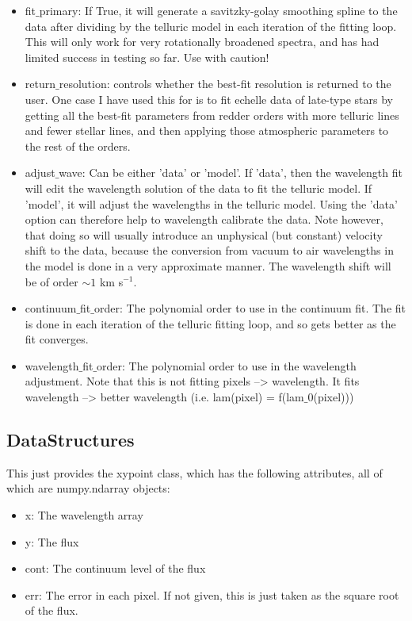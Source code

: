 \documentclass{article}
\begin{document}
\begin{itemize}
\begin{itemize}
      \item fit$\_$primary: If True, it will generate a savitzky-golay smoothing spline to the data after dividing by the telluric model in each iteration of the fitting loop. This will only work for very rotationally broadened spectra, and has had limited success in testing so far. Use with caution!

      \item return$\_$resolution: controls whether the best-fit resolution is returned to the user. One case I have used this for is to fit echelle data of late-type stars by getting all the best-fit parameters from redder orders with more telluric lines and fewer stellar lines, and then applying those atmospheric parameters to the rest of the orders.
      
      \item adjust$\_$wave: Can be either 'data' or 'model'. If 'data', then the wavelength fit will edit the wavelength solution of the data to fit the telluric model. If 'model', it will adjust the wavelengths in the telluric model. Using the 'data' option can therefore help to wavelength calibrate the data. Note however, that doing so will usually introduce an unphysical (but constant) velocity shift to the data, because the conversion from vacuum to air wavelengths in the model is done in a very approximate manner. The wavelength shift will be of order $\sim 1$ km s$^{-1}$.
      
      \item continuum$\_$fit$\_$order: The polynomial order to use in the continuum fit. The fit is done in each iteration of the telluric fitting loop, and so gets better as the fit converges.
      
      \item wavelength$\_$fit$\_$order: The polynomial order to use in the wavelength adjustment. Note that this is not fitting pixels --> wavelength. It fits wavelength --> better wavelength (i.e. lam(pixel) = f(lam$\_$0(pixel)))
    
    \end{itemize}
    
  
  
    
    
    
    
\subsection{DataStructures}
\label{subsec:datastructures}
This just provides the xypoint class, which has the following attributes, all of which are numpy.ndarray objects:
\begin{itemize}
  \item x: The wavelength array
  \item y: The flux
  \item cont: The continuum level of the flux
  \item err: The error in each pixel. If not given, this is just taken as the square root of the flux.
\end{itemize}


\end{itemize}
\end{document}
